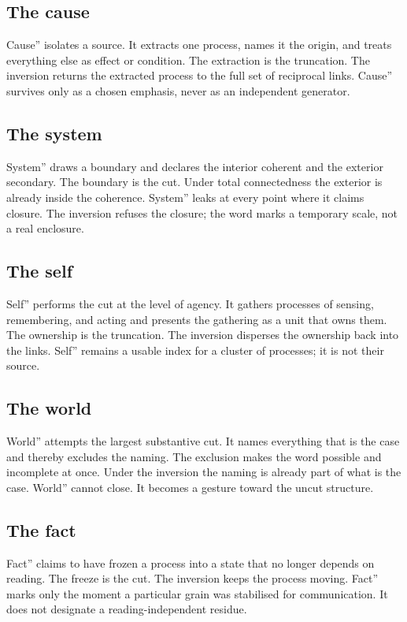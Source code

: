 \documentclass[11pt,a4paper]{article}
\begin{document}
\subsection{The cause} Cause'' isolates a source. It extracts one process, names it the origin, and treats everything else as effect or condition. The extraction is the truncation. The inversion returns the extracted process to the full set of reciprocal links. Cause'' survives only as a chosen emphasis, never as an independent generator.

\subsection{The system} System'' draws a boundary and declares the interior coherent and the exterior secondary. The boundary is the cut. Under total connectedness the exterior is already inside the coherence. System'' leaks at every point where it claims closure. The inversion refuses the closure; the word marks a temporary scale, not a real enclosure.

\subsection{The self} Self'' performs the cut at the level of agency. It gathers processes of sensing, remembering, and acting and presents the gathering as a unit that owns them. The ownership is the truncation. The inversion disperses the ownership back into the links. Self'' remains a usable index for a cluster of processes; it is not their source.

\subsection{The world} World'' attempts the largest substantive cut. It names everything that is the case and thereby excludes the naming. The exclusion makes the word possible and incomplete at once. Under the inversion the naming is already part of what is the case. World'' cannot close. It becomes a gesture toward the uncut structure.

\subsection{The fact} Fact'' claims to have frozen a process into a state that no longer depends on reading. The freeze is the cut. The inversion keeps the process moving. Fact'' marks only the moment a particular grain was stabilised for communication. It does not designate a reading-independent residue.
\end{document}
